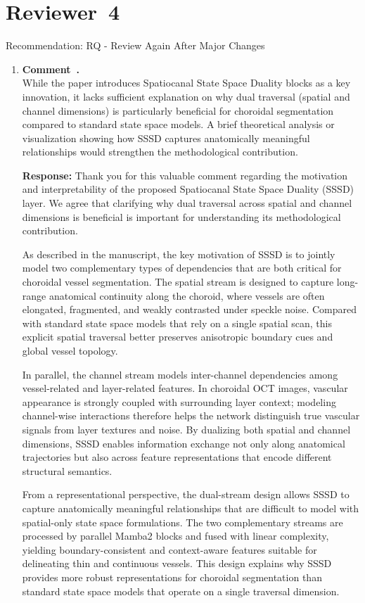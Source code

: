 \documentclass[11pt]{article}
\newcommand{\reviewersection}[1]{\section*{Reviewer~#1}}
\newcommand{\commentresponse}[2]{{\color{blue}\textbf{Response:} #2}}
\newcommand{\commentitem}{\item \textbf{Comment~\arabic{enumi}.}\\\ignorespaces}
\begin{document}
\reviewersection{4}
Recommendation: RQ - Review Again After Major Changes
\begin{enumerate}
    \commentitem While the paper introduces Spatiocanal State Space Duality blocks as a key innovation, it lacks sufficient explanation on why dual traversal (spatial and channel dimensions) is particularly beneficial for choroidal segmentation compared to standard state space models. A brief theoretical analysis or visualization showing how SSSD captures anatomically meaningful relationships would strengthen the methodological contribution.
    
    \commentresponse{1}{
    Thank you for this valuable comment regarding the motivation and interpretability of the proposed Spatiocanal State Space Duality (SSSD) layer. We agree that clarifying why dual traversal across spatial and channel dimensions is beneficial is important for understanding its methodological contribution.

    As described in the manuscript, the key motivation of SSSD is to jointly model two complementary types of dependencies that are both critical for choroidal vessel segmentation. The spatial stream is designed to capture long-range anatomical continuity along the choroid, where vessels are often elongated, fragmented, and weakly contrasted under speckle noise. Compared with standard state space models that rely on a single spatial scan, this explicit spatial traversal better preserves anisotropic boundary cues and global vessel topology.

    In parallel, the channel stream models inter-channel dependencies among vessel-related and layer-related features. In choroidal OCT images, vascular appearance is strongly coupled with surrounding layer context; modeling channel-wise interactions therefore helps the network distinguish true vascular signals from layer textures and noise. By dualizing both spatial and channel dimensions, SSSD enables information exchange not only along anatomical trajectories but also across feature representations that encode different structural semantics.

    From a representational perspective, the dual-stream design allows SSSD to capture anatomically meaningful relationships that are difficult to model with spatial-only state space formulations. The two complementary streams are processed by parallel Mamba2 blocks and fused with linear complexity, yielding boundary-consistent and context-aware features suitable for delineating thin and continuous vessels. This design explains why SSSD provides more robust representations for choroidal segmentation than standard state space models that operate on a single traversal dimension.

}
\end{enumerate}
\end{document}
